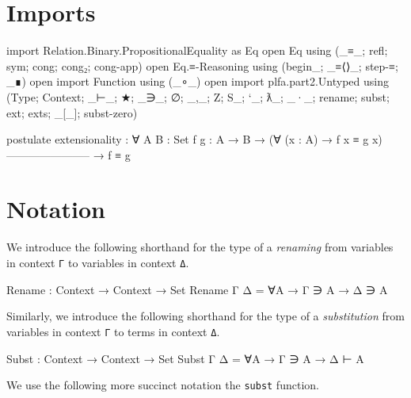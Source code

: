 \hypertarget{imports}{%
\section{Imports}\label{imports}}

\begin{fence}
\begin{code}
import Relation.Binary.PropositionalEquality as Eq
open Eq using (_≡_; refl; sym; cong; cong₂; cong-app)
open Eq.≡-Reasoning using (begin_; _≡⟨⟩_; step-≡; _∎)
open import Function using (_∘_)
open import plfa.part2.Untyped
     using (Type; Context; _⊢_; ★; _∋_; ∅; _,_; Z; S_; `_; ƛ_; _·_;
            rename; subst; ext; exts; _[_]; subst-zero)
\end{code}
\end{fence}

\begin{fence}
\begin{code}
postulate
  extensionality : ∀ {A B : Set} {f g : A → B}
    → (∀ (x : A) → f x ≡ g x)
      -----------------------
    → f ≡ g
\end{code}
\end{fence}

\hypertarget{notation}{%
\section{Notation}\label{notation}}

We introduce the following shorthand for the type of a \emph{renaming}
from variables in context \texttt{Γ} to variables in context \texttt{Δ}.

\begin{fence}
\begin{code}
Rename : Context → Context → Set
Rename Γ Δ = ∀{A} → Γ ∋ A → Δ ∋ A
\end{code}
\end{fence}

Similarly, we introduce the following shorthand for the type of a
\emph{substitution} from variables in context \texttt{Γ} to terms in
context \texttt{Δ}.

\begin{fence}
\begin{code}
Subst : Context → Context → Set
Subst Γ Δ = ∀{A} → Γ ∋ A → Δ ⊢ A
\end{code}
\end{fence}

We use the following more succinct notation the \texttt{subst} function.

